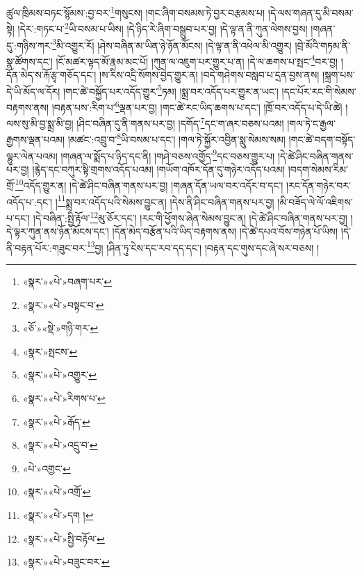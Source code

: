 ཚུལ་ཁྲིམས་བཏང་སྙོམས་:བྱ་བར་\footnote{«སྣར་»«པེ་»བཞག་པར་}གསུངས། །གང་ཞིག་བསམས་ཏེ་བྱར་བརྩམས་པ། །དེ་ལས་གཞན་དུ་མི་བསམ་སྟེ། །དེར་:གཏང་པ་\footnote{«སྣར་»«པེ་»བསྟང་བ་}ཡི་བསམ་པ་ཡིས། །དེ་ཉིད་རེ་ཞིག་བསྒྲུབ་པར་བྱ། །དེ་ལྟ་ན་ནི་ཀུན་ལེགས་བྱས། །གཞན་དུ་:གཉིས་ཀར་\footnote{«ཅོ་»«སྡེ་»གཉི་གར་}མི་འགྱུར་རོ། །ཤེས་བཞིན་མ་ཡིན་ཉེ་ཉོན་མོངས། །དེ་ལྟ་ན་ནི་འཕེལ་མི་འགྱུར། །བྲེ་མོའི་གཏམ་ནི་སྣ་ཚོགས་དང་། །ངོ་མཚར་ལྟད་མོ་རྣམ་མང་པོ། །ཀུན་ལ་འཇུག་པར་གྱུར་པ་ན། །དེ་ལ་ཆགས་པ་སྤང་\footnote{«སྣར་»སྤངས་}བར་བྱ། །དོན་མེད་ས་རྐོ་རྩྭ་གཅོད་དང་། །ས་རིས་འདྲི་སོགས་བྱེད་གྱུར་ན། །བདེ་གཤེགས་བསླབ་པ་དྲན་བྱས་ནས། །སྐྲག་པས་དེ་ཡི་མོད་ལ་དོར། །གང་ཚེ་བསྐྱོད་པར་འདོད་གྱུར་\footnote{«སྣར་»«པེ་»འགྱུར་}ཏམ། །སྨྲ་བར་འདོད་པར་གྱུར་ན་ཡང་། །དང་པོར་རང་གི་སེམས་བརྟགས་ནས། །བརྟན་པས་:རིག་པ་\footnote{«སྣར་»«པེ་»རིགས་པ་}ལྡན་པར་བྱ། །གང་ཚེ་རང་ཡིད་ཆགས་པ་དང་། །ཁྲོ་བར་འདོད་པ་དེ་ཡི་ཚེ། །ལས་སུ་མི་བྱ་སྨྲ་མི་བྱ། །ཤིང་བཞིན་དུ་ནི་གནས་པར་བྱ། །དགོད་\footnote{«སྣར་»«པེ་»རྒོད་}དང་ག་ཞར་བཅས་པའམ། །གལ་ཏེ་ང་རྒྱལ་རྒྱགས་ལྡན་པའམ། །མཚང་:འབྲུ་བ་\footnote{«སྣར་»«པེ་»འདྲུ་བ་}ཡི་བསམ་པ་དང་། །གལ་ཏེ་སྐྱོར་འབྱིན་སླུ་སེམས་སམ། །གང་ཚེ་བདག་བསྟོད་ལྷུར་ལེན་པའམ། །གཞན་ལ་སྨོད་པ་ཉིད་དང་ནི། །གཤེ་བཅས་འགྱོད་\footnote{«པེ་»འགྱང་}དང་བཅས་གྱུར་པ། །དེ་ཚེ་ཤིང་བཞིན་གནས་པར་བྱ། །རྙེད་དང་བཀུར་སྟི་གྲགས་འདོད་པའམ། །གཡོག་འཁོར་དོན་དུ་གཉེར་འདོད་པའམ། །བདག་སེམས་རིམ་གྲོ་\footnote{«སྣར་»«པེ་»འགྲོ་}འདོད་གྱུར་ན། །དེ་ཚེ་ཤིང་བཞིན་གནས་པར་བྱ། །གཞན་དོན་ཡལ་བར་འདོར་བ་དང་། །རང་དོན་གཉེར་བར་འདོད་པ་:དང་། །\footnote{«སྣར་»«པེ་»དག །}སྨྲ་བར་འདོད་པའི་སེམས་བྱུང་ན། །དེས་ནི་ཤིང་བཞིན་གནས་པར་བྱ། །མི་བཟོད་ལེ་ལོ་འཇིགས་པ་དང་། །དེ་བཞིན་:སྤྱི་རྟོལ་\footnote{«སྣར་»«པེ་»སྤྱི་བརྟོལ་}མུ་ཅོར་དང་། །རང་གི་ཕྱོགས་ཞེན་སེམས་བྱུང་ན། །དེ་ཚེ་ཤིང་བཞིན་གནས་པར་བྱ། །དེ་ལྟར་ཀུན་ནས་ཉོན་མོངས་དང་། །དོན་མེད་བརྩོན་པའི་ཡིད་བརྟགས་ནས། །དེ་ཚེ་དཔའ་བོས་གཉེན་པོ་ཡིས། །དེ་ནི་བརྟན་པོར་:གཟུང་བར་\footnote{«སྣར་»«པེ་»བཟུང་བར་}བྱ། །ཤིན་ཏུ་ངེས་དང་རབ་དད་དང་། །བརྟན་དང་གུས་དང་ཞེ་སར་བཅས། །
